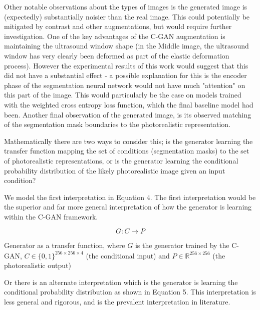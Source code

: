 Other notable observations about the types of images is the generated image is
(expectedly) substantially noisier than the real image. This could potentially
be mitigated by contrast and other augmentations, but would require further
investigation. One of the key advantages of the C-GAN augmentation is
maintaining the ultrasound window shape (in the Middle image, the ultrasound
window has very clearly been deformed as part of the elastic deformation
process). However the experimental results of this work would suggest that this
did not have a substantial effect - a possible explanation for this is the
encoder phase of the segmentation neural network would not have much "attention"
on this part of the image. This would particularly be the case on models trained
with the weighted cross entropy loss function, which the final baseline model
had been. Another final observation of the generated image, is its observed
matching of the segmentation mask boundaries to the photorealistic
representation. \newline

Mathematically there are two ways to consider this; is the generator learning
the transfer function mapping the set of conditions (segmentation masks) to the
set of photorealistic representations, or is the generator learning the
conditional probability distribution of the likely photorealistic image given an
input condition? \newline

We model the first interpretation in Equation 4. The first interpretation would
be the superior and far more general interpretation of how the generator is
learning within the C-GAN framework. \newline 

\begin{equation}
    G: C \rightarrow P
\end{equation} \newline

Generator as a transfer function, where $G$ is the generator trained by the
C-GAN, $C \in \{0,1\}^{256\times256\times4}$ (the conditional input) and $P \in
\mathbb{R}^{256\times256}$ (the photorealistic output) \newline


Or there is an alternate interpretation which is the generator is learning the
conditional probability distribution as shown in Equation 5. This
interpretation is less general and rigorous, and is the prevalent interpretation
in literature. \newline

